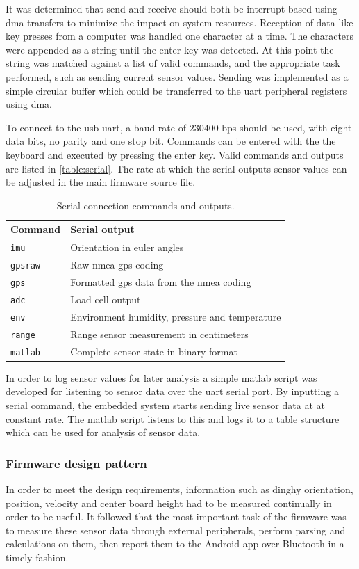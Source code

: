 It was determined that send and receive should both be interrupt based using \gls{dma} transfers to minimize the impact on system resources. Reception of data like key presses from a computer was handled one character at a time. The characters were appended as a string until the enter key was detected. At this point the string was matched against a list of valid commands, and the appropriate task performed, such as sending current sensor values. Sending was implemented as a simple circular buffer which could be transferred to the \gls{uart} peripheral registers using \gls{dma}.

To connect to the \gls{usb}-\gls{uart}, a baud rate of $230400$ bps should be used, with eight data bits, no parity and one stop bit. Commands can be entered with the the keyboard and executed by pressing the enter key. Valid commands and outputs are listed in \autoref{table:serial}. The rate at which the serial outputs sensor values can be adjusted in the main firmware source file.
\begin{table}[H]
\centering
\begin{tabular}{ l | l }
 	Command 		& Serial output \\
  	\hline
  	\texttt{imu} 		& Orientation in euler angles \\
  	\texttt{gpsraw} 	& Raw \gls{nmea} \gls{gps} coding\\
  	\texttt{gps} 		& Formatted \gls{gps} data from the \gls{nmea} coding\\
  	\texttt{adc} 		& Load cell output\\
  	\texttt{env} 		& Environment humidity, pressure and temperature \\
  	\texttt{range} 	& Range sensor measurement in centimeters \\
  	\texttt{matlab} 	& Complete sensor state in binary format \\
\end{tabular}
\caption{Serial connection commands and outputs.}
\label{table:serial}
\end{table}

In order to log sensor values for later analysis a simple \gls{matlab} script was developed for listening to sensor data over the \gls{uart} serial port. By inputting a serial command, the embedded system starts sending live sensor data at at constant rate. The \gls{matlab} script listens to this and logs it to a table structure which can be used for analysis of sensor data.

\subsubsection{Firmware design pattern}
In order to meet the design requirements, information such as dinghy orientation, position, velocity and center board height had to be measured continually in order to be useful. It followed that the most important task of the firmware was to measure these sensor data through external peripherals, perform parsing and calculations on them, then report them to the Android app over Bluetooth in a timely fashion. 


